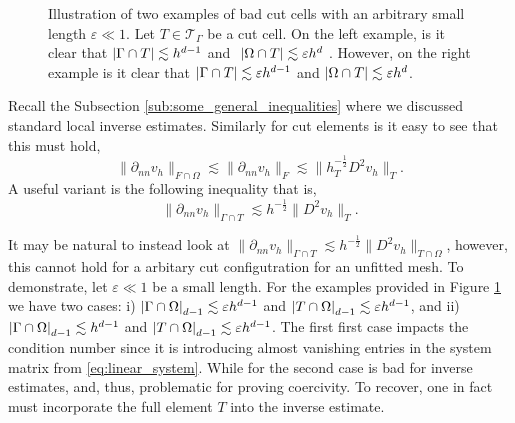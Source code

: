 \begin{figure}[b]
\begin{minipage}{0.4\textwidth}
    \end{minipage}
        \caption{Illustration of two examples of bad cut cells with an arbitrary small length $\varepsilon \ll 1 $. Let $T \in  \mathcal{T}_{\Gamma } $ be a cut cell.  On the left example, is it clear that $\left\lvert  \Gamma \cap T  \right\rvert
            \lesssim  h^{d-1}$ and $  \ \abs{ \Omega  \cap T } \lesssim  \varepsilon  h^{d}$  . However, on the right example is it clear that  $\left\lvert  \Gamma \cap T  \right\rvert
            \lesssim  \varepsilon h^{d-1}$ and $\left\lvert  \Omega  \cap T  \right\rvert \lesssim  \varepsilon  h^{d}$.}
        \label{fig:intersection-example}
\end{figure}


Recall the Subsection \ref{sub:some_general_inequalities} where we discussed standard local inverse estimates.
Similarly for cut elements is it easy to see that this must hold,
\begin{equation}
     \| \partial _{nn}  v_{h} \|_{F \cap \Omega    }^{  }  \lesssim\| \partial _{nn}  v_{h} \|_{F }^{  }  \lesssim   \| h_{T}^{-\frac{1}{2}} D ^2 v_{h} \|_{ T }^{  }.
\end{equation}
A useful variant is the following inequality that is,
\begin{equation}
    \label{eq:inv_full}
\| \partial _{nn} v_{h} \|_{ \Gamma \cap T  }^{  } \lesssim h^{-\frac{1}{2}} \| D^2 v_{h} \|_{ T }^{  }.
\end{equation}
\begin{remark}
    It may be natural to instead look at $\| \partial _{nn} v_{h} \|_{ \Gamma \cap T  }^{  } \lesssim h^{-\frac{1}{2}} \| D^2 v_{h} \|_{ T\cap \Omega  }^{  }$, however, this cannot hold for a arbitary cut configutration for an unfitted mesh. To demonstrate, let $\varepsilon \ll 1$ be a small length. For the examples provided in
    Figure \ref{fig:intersection-example} we have two cases: i) $\left\lvert  \Gamma \cap \Omega   \right\rvert_{d-1} \lesssim \varepsilon h^{d-1}  $ and $\left\lvert  T \cap \Omega   \right\rvert_{d-1} \lesssim \varepsilon h^{d-1}  $, and ii)
    $\left\lvert  \Gamma \cap \Omega   \right\rvert_{d-1} \lesssim  h^{d-1}  $ and $\left\lvert  T \cap \Omega   \right\rvert_{d-1} \lesssim \varepsilon h^{d-1}  $.
    The first first case impacts the condition number since it is introducing almost vanishing entries in the system matrix from \eqref{eq:linear_system}.
    While for the second case is bad for inverse estimates, and, thus, problematic for proving coercivity. To recover, one in fact must incorporate the full element $T$ into the inverse estimate.
\end{remark}


